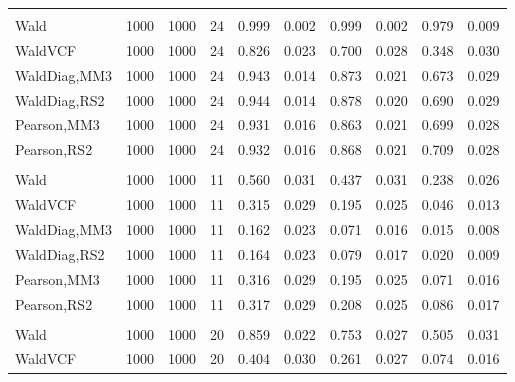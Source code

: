 \documentclass[
]{article}
\begin{document}
\begin{table}[H]
{\begin{tabular}[t]{lrrrrrrlrr}
\addlinespace[0.3em]
\multicolumn{10}{l}{\textbf{1F 15V}}\\
\hspace{1em}Wald & 1000 & 1000 & 24 & 0.999 & 0.002 & 0.999 & 0.002 & 0.979 & 0.009\\
\hspace{1em}WaldVCF & 1000 & 1000 & 24 & 0.826 & 0.023 & 0.700 & 0.028 & 0.348 & 0.030\\
\hspace{1em}WaldDiag,MM3 & 1000 & 1000 & 24 & 0.943 & 0.014 & 0.873 & 0.021 & 0.673 & 0.029\\
\hspace{1em}WaldDiag,RS2 & 1000 & 1000 & 24 & 0.944 & 0.014 & 0.878 & 0.020 & 0.690 & 0.029\\
\hspace{1em}Pearson,MM3 & 1000 & 1000 & 24 & 0.931 & 0.016 & 0.863 & 0.021 & 0.699 & 0.028\\
\hspace{1em}Pearson,RS2 & 1000 & 1000 & 24 & 0.932 & 0.016 & 0.868 & 0.021 & 0.709 & 0.028\\
\addlinespace[0.3em]
\multicolumn{10}{l}{\textbf{2F 10V}}\\
\hspace{1em}Wald & 1000 & 1000 & 11 & 0.560 & 0.031 & 0.437 & 0.031 & 0.238 & 0.026\\
\hspace{1em}WaldVCF & 1000 & 1000 & 11 & 0.315 & 0.029 & 0.195 & 0.025 & 0.046 & 0.013\\
\hspace{1em}WaldDiag,MM3 & 1000 & 1000 & 11 & 0.162 & 0.023 & 0.071 & 0.016 & 0.015 & 0.008\\
\hspace{1em}WaldDiag,RS2 & 1000 & 1000 & 11 & 0.164 & 0.023 & 0.079 & 0.017 & 0.020 & 0.009\\
\hspace{1em}Pearson,MM3 & 1000 & 1000 & 11 & 0.316 & 0.029 & 0.195 & 0.025 & 0.071 & 0.016\\
\hspace{1em}Pearson,RS2 & 1000 & 1000 & 11 & 0.317 & 0.029 & 0.208 & 0.025 & 0.086 & 0.017\\
\addlinespace[0.3em]
\multicolumn{10}{l}{\textbf{3F 15V}}\\
\hspace{1em}Wald & 1000 & 1000 & 20 & 0.859 & 0.022 & 0.753 & 0.027 & 0.505 & 0.031\\
\hspace{1em}WaldVCF & 1000 & 1000 & 20 & 0.404 & 0.030 & 0.261 & 0.027 & 0.074 & 0.016\\

\end{tabular}}
\end{table}
\end{document}
